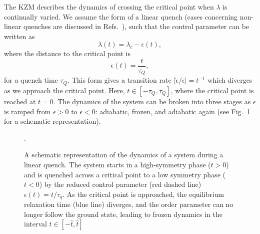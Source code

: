 The KZM describes the dynamics of crossing the critical point when \( \lambda \)
is continually varied.
We assume the form of a linear quench (cases concerning non-linear quenches are
discussed in Refs.~\cite{Barankov2008,Mondal2009}), such that the control
parameter can be written as
\begin{equation}
    \lambda(t) = \lambda_c - \epsilon(t),
\end{equation}
where the distance to the critical point is
\begin{equation}
    \epsilon(t) = \frac{t}{\tau_Q},
    \label{eq: time-dependent-epsilon}
\end{equation}
for a quench time \( \tau_Q \).
This form gives a transition rate \( |\dot{\epsilon}/{\epsilon}|=t^{-1} \) which
diverges as we approach the critical point.
Here, \( t \in [-\tau_Q, \tau_Q] \), where the critical point is reached at
\( t=0 \).
The dynamics of the system can be broken into three stages as \( \epsilon \) is
ramped from \( \epsilon > 0 \) to \( \epsilon < 0 \): adiabatic, frozen, and
adiabatic again (see Fig.~\ref{fig: adiabatic-impulse} for a schematic
representation).
\begin{figure}
    \centering
    \caption[Schematic representation of the dynamics of a system during a
        linear quench]
    {A schematic representation of the dynamics of a system during a
        linear quench. The system starts in a high-symmetry phase (\( t > 0 \)) and
        is quenched across a critical point to a low symmetry phase (\( t < 0 \)) by
        the reduced control parameter (red dashed line) \( \epsilon(t) = t/\tau_q \).
        As the critical point is approached, the equilibrium relaxation time
        (blue line) diverges, and the order parameter can no longer follow the
        ground state, leading to frozen dynamics in the interval
        \( t \in [-\hat{t}, \hat{t}] \)}.\label{fig: adiabatic-impulse}
\end{figure}

